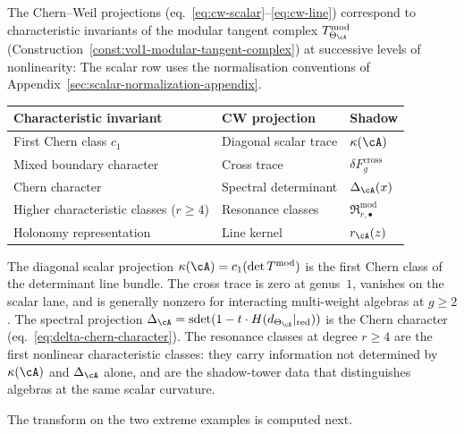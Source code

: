 \begin{remark}
\label{rem:k-theoretic-hierarchy}
The Chern--Weil projections
(eq.~\eqref{eq:cw-scalar}--\eqref{eq:cw-line}) correspond
to characteristic invariants of the modular tangent complex
$T^{\mathrm{mod}}_{\Theta_\cA}$
(Construction~\ref{const:vol1-modular-tangent-complex})
at successive levels of nonlinearity:
The scalar row uses the normalisation conventions of
Appendix~\ref{sec:scalar-normalization-appendix}.
\begin{center}
\renewcommand{\arraystretch}{1.2}
\begin{tabular}{lll}
\textbf{Characteristic invariant} & \textbf{CW projection}
 & \textbf{Shadow} \\
\hline
First Chern class $c_1$ & Diagonal scalar trace & $\kappa(\cA)$ \\
Mixed boundary character & Cross trace & $\delta F_g^{\mathrm{cross}}$ \\
Chern character & Spectral determinant & $\Delta_\cA(x)$ \\
Higher characteristic classes ($r \geq 4$)
 & Resonance classes & $\mathfrak{R}^{\mathrm{mod}}_{r,\bullet}$ \\
Holonomy representation & Line kernel & $r_\cA(z)$
\end{tabular}
\end{center}
The diagonal scalar projection
$\kappa(\cA) = c_1(\det T^{\mathrm{mod}})$ is the first Chern
class of the determinant line bundle. The cross trace is zero at
genus~$1$, vanishes on the scalar lane, and is generally nonzero for
interacting multi-weight algebras at $g\geq2$. The spectral
projection $\Delta_\cA =
\operatorname{sdet}(1 - t \cdot H(d_{\Theta_\cA}|_{\mathrm{red}}))$
is the Chern character
(eq.~\eqref{eq:delta-chern-character}). The resonance
classes at degree $r \geq 4$ are the first nonlinear
characteristic classes: they carry information not determined
by $\kappa(\cA)$ and $\Delta_\cA$ alone, and are the shadow-tower data
that distinguishes algebras at the same scalar curvature.
\end{remark}

The transform on the two extreme examples is computed next.

